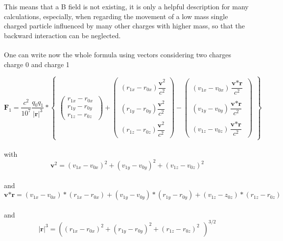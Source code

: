 \documentclass[10pt,titlepage]{article}
\begin{document}
This means that a B field is not existing, it is only a helpful description for many calculations, especially, when regarding the movement of a low mass single charged particle influenced by many other charges with higher mass, so that the backward interaction can be neglected.
\\
\\
One can write now the whole formula using vectors considering two charges\\
charge 0 and charge 1

\begin{equation}
\textbf{$\textbf{F}_1$}=\dfrac{c^2}{10^7}\dfrac{q_0q_1}{\vert\textbf{r}\vert^3}*
\begin{Bmatrix}
\begin{pmatrix}r_{1x}-r_{0x}\ \\ r_{1y}-r_{0y}\\r_{1z}-r_{0z}\end{pmatrix}+
\begin{pmatrix}(r_{1x}-r_{0x})\dfrac{\textbf{v}^2}{c^2}\\ \\(r_{1y}-r_{0y})\dfrac{\textbf{v}^2}{c^2}\\ \\(r_{1z}-r_{0z})\dfrac{\textbf{v}^2}{c^2}\end{pmatrix}-
\begin{pmatrix}(v_{1x}-v_{0x})\dfrac{\textbf{v}*\textbf{r}}{c^2}\\ \\(v_{1y}-v_{0y})\dfrac{\textbf{v}*\textbf{r}}{c^2}\\ \\(v_{1z}-v_{0z})\dfrac{\textbf{v}*\textbf{r}}{c^2}\end{pmatrix}
\end{Bmatrix}
\end{equation}\\
with  \begin{equation}
\textbf{v}^2=(v_{1x}-v_{0x})^2+(v_{1y}-v_{0y})^2+(v_{1z}-v_{0z})^2
\end{equation}  
\\and \begin{equation}
\textbf{v*r}=(v_{1x}-v_{0x})*(r_{1x}-r_{0x})+(v_{1y}-v_{0y})*(r_{1y}-r_{0y})+(v_{1z}-z_{0z})*(r_{1z}-r_{0z})
\end{equation}
\\and   \begin{equation}
\vert\textbf{r}\vert^3=((r_{1x}-r_{0x})^2+(r_{1y}-r_{0y})^2+(r_{1z}-r_{0z})^2 \ \ )^{3/2}
\end{equation}
\end{document}
